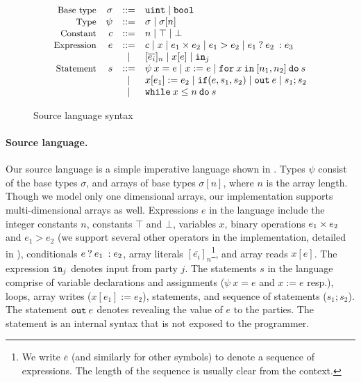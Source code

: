 \begin{figure}[htp]
  \footnotesize
  \[
  \begin{array}{rrcl}
    \text{\small{Base type}} & \sigma &::=& {\mathtt{uint}} \mid {\ensuremath{\mathtt{bool}}}\\
    \text{\small{Type}} & \psi &::=& \sigma \mid \sigma[n]\\
    \text{\small{Constant}} & c &::=& n \mid \top \mid \bot\\
    \text{\small{Expression}} & e &::=& c \mid x \mid e_{1} \times e_{2} \mid e_{1} > e_{2} \mid {{e_{1}}\:?\:{e_{2}}\::{e_{3}}}\\
    & &\mid& [\overline{e_{i}}]_{n} \mid x[e] \mid {\ensuremath{\mathtt{in}}}_{j}\\
    \text{\small{Statement}} & s &::=& \psi\:x = e \mid x := e \mid {\ensuremath{\mathtt{for}}}\:{x}\:{\mathtt{in}}\:[{n_{1}}, {n_{2}}]\:{\mathtt{do}}\:{s}\\
    & & \mid& x[e_{1}] := e_{2} \mid {\ensuremath{\mathtt{if}}}({e}, {s_{1}}, {s_{2}}) \mid {\ensuremath{\mathtt{out}}}\:e \mid s_{1}; s_{2}\\
    & & \mid& {\mathtt{while}}\:{x} \leq {n}\:{\mathtt{do}}\:{s}
  \end{array}
  \]
\caption{Source language syntax}
\label{fig:srclang}
\end{figure}

\paragraph{Source language.} Our source language
 is a simple imperative language shown in . Types
$\psi$ consist of the base types $\sigma$, and arrays
of base types $\sigma[n]$, where $n$ is the array length. Though we
model only one dimensional arrays, our implementation supports
 multi-dimensional arrays as well. Expressions $e$ in the language include the
 integer constants $n$,  constants $\top$ and $\bot$,
variables $x$, binary operations $e_{1} \times e_{2}$ and $e_{1} >
e_{2}$ (we support several other
operators in the implementation, detailed in ),
conditionals ${{e}\:?\:{e_{1}}\::{e_{2}}}$,
array literals
$[\overline{e_{i}}]_{n}$\footnote{We write $\overline{e}$ (and
  similarly for other symbols) to denote a sequence of expressions.
The length of the sequence is usually clear from the context.}, and
array reads $x[e]$. The expression ${\mathtt{in}}_{j}$ denotes input from
party $j$. The statements $s$ in the language comprise of variable
declarations and assignments ($\psi\:x = e$ and $x := e$ resp.),
 loops, array writes ($x[e_{1}] := e_{2}$), 
statements, and sequence of statements ($s_{1}; s_{2}$). The statement
${\mathtt{out}}\:e$ denotes revealing the value of $e$ to the
parties. The  statement is an internal syntax that is not
exposed to the programmer. \\

